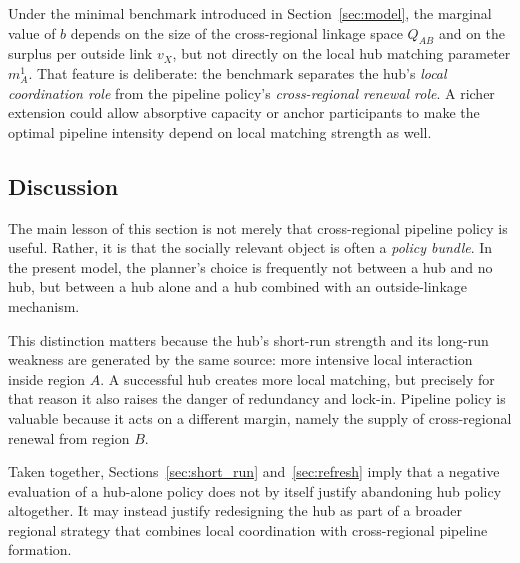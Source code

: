 Under the minimal benchmark introduced in Section~\ref{sec:model}, the marginal value of $b$ depends on the size of the cross-regional linkage space $Q_{AB}$ and on the surplus per outside link $v_X$, but not directly on the local hub matching parameter $m_A^1$. That feature is deliberate: the benchmark separates the hub's \emph{local coordination role} from the pipeline policy's \emph{cross-regional renewal role}. A richer extension could allow absorptive capacity or anchor participants to make the optimal pipeline intensity depend on local matching strength as well.

\subsection{Discussion}

The main lesson of this section is not merely that cross-regional pipeline policy is useful. Rather, it is that the socially relevant object is often a \emph{policy bundle}. In the present model, the planner's choice is frequently not between a hub and no hub, but between a hub alone and a hub combined with an outside-linkage mechanism.

This distinction matters because the hub's short-run strength and its long-run weakness are generated by the same source: more intensive local interaction inside region $A$. A successful hub creates more local matching, but precisely for that reason it also raises the danger of redundancy and lock-in. Pipeline policy is valuable because it acts on a different margin, namely the supply of cross-regional renewal from region $B$.

Taken together, Sections~\ref{sec:short_run} and~\ref{sec:refresh} imply that a negative evaluation of a hub-alone policy does not by itself justify abandoning hub policy altogether. It may instead justify redesigning the hub as part of a broader regional strategy that combines local coordination with cross-regional pipeline formation.

